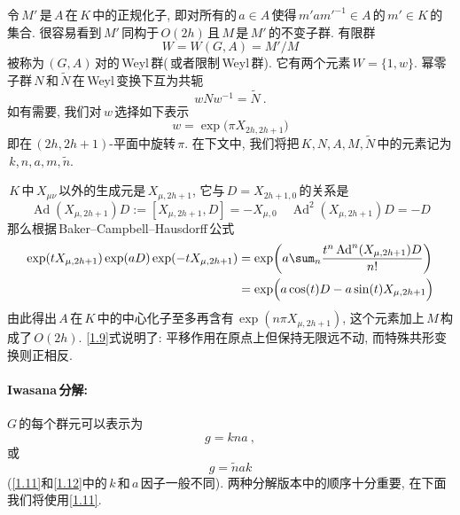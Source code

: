 令\,$M'$\,是$\,A\,$在$\,K\,$中的正规化子, 即对所有的$\,a\in A\,$使得$\,m'am'^{-1}\in A\,$的$\,m'\in K\,$的集合. 很容易看到$\,M'\,$同构于$\,O(2h)\,$且$\,M\,$是$\,M'\,$的不变子群. 有限群
\begin{equation}
    W=W(G,A)=M'/M
\end{equation}
被称为$\,(G,A)\,$对的\,Weyl\,群(\,或者限制\,Weyl\,群). 它有两个元素$\,W=\{1,w\}$. 幂零子群$\,N\,$和$\,\tilde{N}\,$在\,Weyl\,变换下互为共轭
\begin{equation}
    wNw^{-1}=\tilde{N} \:. \label{1.9}
\end{equation}
如有需要, 我们对$\,w\,$选择如下表示
\begin{equation}
    w=\exp\bigl(\pi X_{2h,2h+1}\bigr) \label{1.10}
\end{equation}
即在$\,(2h,2h{+}1)$-平面中旋转$\,\pi$. 在下文中, 我们将把$\,K,N,A,M,\tilde{N}$\,中的元素记为$\,k,n,a,m,\tilde{n}$.
\begin{tcolorbox}
    \begin{note}
        $\,K\,$中$\,X_{\mu\nu}\,$以外的生成元是$\,X_{\mu,2h+1}$, 它与$\,D=X_{2h+1,0}\,$的关系是
        \begin{equation*}
         \operatorname{Ad}({X_{\mu,2h+1}})D:=  [X_{\mu,2h+1},D]=-X_{\mu,0} \quad 
         \operatorname{Ad}^{2}(X_{\mu,2h+1})D=-D 
        \end{equation*}
    那么根据\,Baker–Campbell–Hausdorff\,公式
    \begin{align*}
        \exp(t X_{\mu,2h+1}) \exp(a D )\exp(-t X_{\mu,2h+1})
        &=\exp\biggl(a \sum_{n}\frac{t^{n}\operatorname{Ad}^{n}(X_{\mu,2h+1})D}{n!}\biggr) \\
        &=\exp\Bigl( a\cos(t)D-a\sin(t)X_{\mu,2h{+}1}\Bigr)
    \end{align*}
    由此得出$\,A\,$在$\,K\,$中的中心化子至多再含有\,$\exp(n\pi  X_{\mu,2h{+}1})$, 这个元素加上$\,M\,$构成了$\,O(2h)$. \eqref{1.9}式说明了: 平移作用在原点上但保持无限远不动, 而特殊共形变换则正相反.
    \end{note}
\end{tcolorbox}

\paragraph*{Iwasana\,分解:} $G\,$的每个群元可以表示为
\begin{equation}
    g=kna \:, \label{1.11}
\end{equation}
或
\begin{equation}
    g=\tilde{n}ak \label{1.12}
\end{equation}
(\eqref{1.11}和\eqref{1.12}中的$\,k\,$和$\,a\,$因子一般不同). 两种分解版本中的顺序十分重要, 在下面我们将使用\eqref{1.11}.

